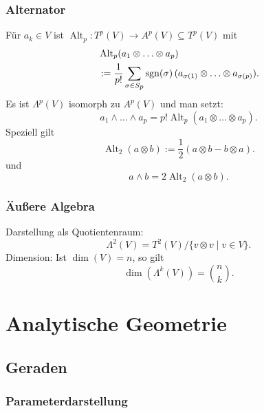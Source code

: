 \subsubsection{Alternator}
Für $a_k\in V$ ist
$\operatorname{Alt}_p\colon T^p(V)\to A^p(V)\subseteq T^p(V)$
mit
\begin{equation}
\begin{split}
& \operatorname{Alt}_p (a_1\otimes\ldots\otimes a_p)\\
&:= \frac{1}{p!}\sum_{\sigma\in S_{\scriptstyle p}}
\operatorname*{sgn}(\sigma)\,(a_{\sigma(1)}\otimes\ldots\otimes a_{\sigma(p)}).
\end{split}
\end{equation}
Es ist $\Lambda^p(V)$ isomorph zu $A^p(V)$ und man setzt:
\begin{equation}
a_1\wedge\ldots\wedge a_p
= p!\operatorname{Alt}_p(a_1\otimes\ldots\otimes a_p).
\end{equation}
Speziell gilt
\begin{equation}
\operatorname{Alt}_2 (a\otimes b) := \frac{1}{2}(a\otimes b-b\otimes a).
\end{equation}
und
\begin{equation}
a\wedge b = 2\operatorname{Alt}_2(a\otimes b).
\end{equation}

\subsubsection{Äußere Algebra}
Darstellung als Quotientenraum:
\begin{equation}
\Lambda^2(V) = T^2(V)/\{v\otimes v\mid v\in V\}.
\end{equation}
Dimension: Ist $\dim(V)=n$, so gilt
\begin{equation}
\dim(\Lambda^k(V)) = \binom{n}{k}.
\end{equation}

\clearpage
\section{Analytische Geometrie}
\subsection{Geraden}
\subsubsection{Parameterdarstellung}

